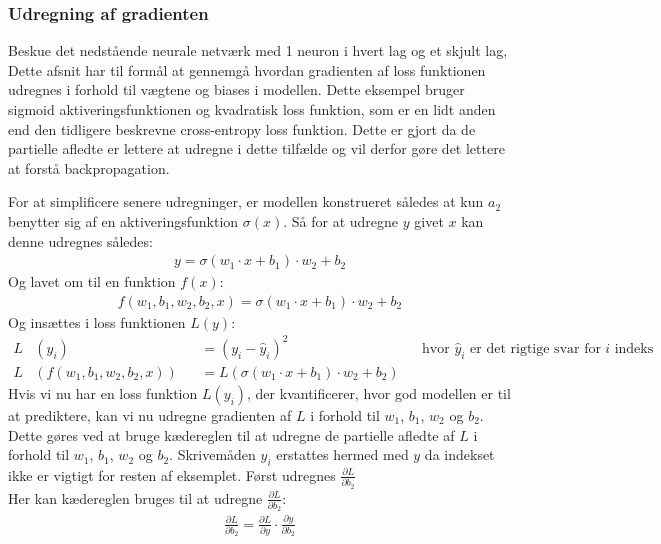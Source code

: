 \documentclass{article}
\begin{document}
\subsubsection{Udregning af gradienten}
Beskue det nedstående neurale netværk med 1 neuron i hvert lag og et skjult lag, Dette afsnit har til formål at gennemgå hvordan gradienten af loss funktionen udregnes i forhold til vægtene og biases i modellen. Dette eksempel bruger sigmoid aktiveringsfunktionen og kvadratisk loss funktion, som er en lidt anden end den tidligere beskrevne cross-entropy loss funktion. Dette er gjort da de partielle afledte er lettere at udregne i dette tilfælde og vil derfor gøre det lettere at forstå backpropagation.
\begin{center}
  
  \label{fig:neural_network3}
\end{center}
For at simplificere senere udregninger, er modellen konstrueret således at kun $a_2$ benytter sig af en aktiveringsfunktion $\sigma(x)$. Så for at udregne $y$ givet $x$ kan denne udregnes således:
\begin{align}
  y= \sigma(w_1 \cdot x + b_1) \cdot w_2 + b_2  
\end{align}
Og lavet om til en funktion $f(x)$:
\begin{align}
  f(w_1, b_1, w_2, b_2, x) = \sigma(w_1 \cdot x + b_1) \cdot w_2 + b_2
\end{align}
Og insættes i loss funktionen $L(y)$:
\begin{align}
  L&(y_i) &&= (y_i - \hat{y}_i)^2 && \text{hvor } \hat{y}_i \text{ er det rigtige svar for $i$ indeks}\\
  L&(f(w_1, b_1, w_2, b_2, x)) &&= L(\sigma(w_1 \cdot x + b_1) \cdot w_2 + b_2)
  \label{eq:full_loss}
\end{align}
Hvis vi nu har en loss funktion $L(y_i)$, der kvantificerer, hvor god modellen er til at prediktere, kan vi nu udregne gradienten af $L$ i forhold til $w_1$, $b_1$, $w_2$ og $b_2$. Dette gøres ved at bruge kædereglen til at udregne de partielle afledte af $L$ i forhold til $w_1$, $b_1$, $w_2$ og $b_2$. Skrivemåden $y_i$ erstattes hermed med $y$ da indekset ikke er vigtigt for resten af eksemplet. Først udregnes $\frac{\partial L}{\partial b_2}$\\
Her kan kædereglen bruges til at udregne $\frac{\partial L}{\partial b_2}$:
\begin{align}
  \frac{\partial L}{\partial b_2} = \frac{\partial L}{\partial y} \cdot \frac{\partial y}{\partial b_2}
\end{align}
\end{document}
